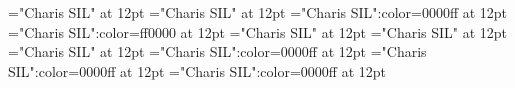 \documentclass[a4paper]{article}
\begin{document}
\pagestyle{plain}
\sloppy
\setlength{\parfillskip}{0pt plus 1fil}
\font\sectionletter="Charis SIL" at 12pt
\font\articlesectionletter="Charis SIL" at 12pt
\font\sensearticlesectionletter="Charis SIL":color=0000ff at 12pt
\font\sensebeforearticlesectionletter="Charis SIL":color=ff0000 at 12pt
\font\firstoftypeheadwordlastoftypesectionletter="Charis SIL" at 12pt
\font\firstoftypelastoftypepronunciationarticlesectionletter="Charis SIL" at 12pt
\font\firstoftypelastoftypestressfirstoftypelastoftypepronunciationarticlesectionletter="Charis SIL" at 12pt
\font\firstoftypegrammarcategorylastoftypesensearticlesectionletter="Charis SIL":color=0000ff at 12pt
\font\exampleusefirstoftypelastoftypesensearticlesectionletter="Charis SIL":color=0000ff at 12pt
\font\examplesensearticlesectionletter="Charis SIL":color=0000ff at 12pt

\newpage 
\thispagestyle{empty} 
\mbox{} 
\newpage 
\newpage 
\setcounter{page}{1} 
\pagestyle{fancy} 

\end{document}
